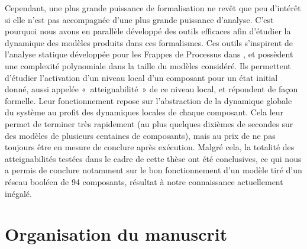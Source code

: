 Cependant, une plus grande puissance de formalisation ne revêt que peu d'intérêt si elle n'est
pas accompagnée d'une plus grande puissance d'analyse.
C'est pourquoi nous avons en parallèle développé des outils efficaces
afin d'étudier la dynamique des modèles produits dans ces formalismes.
Ces outils s'inspirent de l'analyse statique développée pour les Frappes de Processus
dans \toref,
et possèdent une complexité polynomiale dans la taille du modèles considéré.
Ils permettent d'étudier l'activation d'un niveau local d'un composant pour un état initial donné,
aussi appelée «~atteignabilité~» de ce niveau local,
et répondent de façon formelle.
Leur fonctionnement repose sur l'abstraction de la dynamique globale du système
au profit des dynamiques locales de chaque composant.
Cela leur permet de terminer très rapidement (au plus quelques dixièmes de secondes sur des
modèles de plusieurs centaines de composants),
mais au prix de ne pas toujours être en mesure de conclure après exécution.
Malgré cela, la totalité des atteignabilités testées dans le cadre de cette thèse ont été
conclusives, ce qui nous a permis de conclure notamment sur le bon fonctionnement
d'un modèle tiré d'un réseau booléen de 94 composants,
résultat à notre connaissance actuellement inégalé.



\section{Organisation du manuscrit}

\TODO
